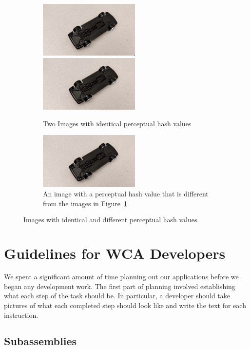 \begin{figure}
  \begin{subfigure}{\textwidth}
    \includegraphics[width=5cm]{figures/perceptual_hash/identical1.jpg}
    \includegraphics[width=5cm]{figures/perceptual_hash/identical2.jpg}
    \caption{Two Images with identical perceptual hash values
    }\label{fig:perceptual_hash_identical}
  \end{subfigure}
  \begin{subfigure}{\textwidth}
    \includegraphics[width=5cm]{figures/perceptual_hash/identical2.jpg}
    \caption{An image with a perceptual hash value that is different from the
    images in Figure~\ref{fig:perceptual_hash_identical}}
  \end{subfigure}
  \caption{Images with identical and different perceptual hash values.
  }\label{fig:perceptual_hash}
\end{figure}

\section{Guidelines for WCA Developers}

We spent a significant amount of time planning out our applications before we
began any development work.
The first part of planning involved establishing what each step of the task
should be.
In particular, a developer should take pictures of what each completed step
should look like and write the text for each instruction.

\subsection{Subassemblies}

